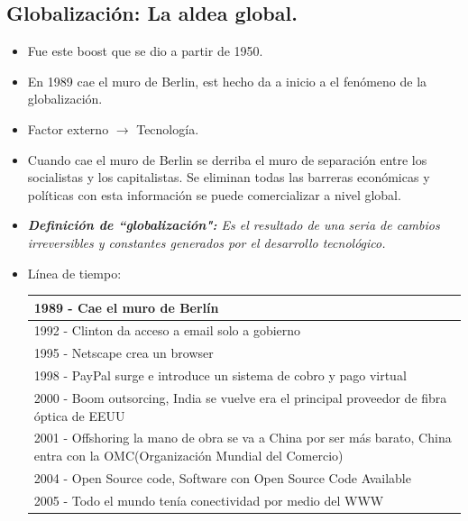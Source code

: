 \subsection{ Globalización: La aldea global.}
\begin{itemize}
    \item Fue este boost que se dio a partir de 1950.
    \item En 1989 cae el muro de Berlin, est hecho da a inicio a el fenómeno de la globalización.
    \item Factor externo $\rightarrow$ Tecnología.
    \item Cuando cae el muro de Berlin se derriba el muro de separación entre los socialistas y los capitalistas. Se eliminan todas las barreras económicas y políticas con esta información se puede comercializar a nivel global.
    \item \emph{\textbf{Definición de ``globalización":} Es el resultado de una seria de cambios irreversibles y constantes generados por el desarrollo tecnológico.}
    \item Línea de tiempo: 
        \begin{center}
            \begin{tabular}{ | p{15cm} | }
                \hline
                    1989 - Cae el muro de Berlín \\ 
                    \hline
                    1992 - Clinton da acceso a email solo a gobierno  \\ 
                    \hline
                    1995 - Netscape crea un browser \\ 
                    \hline
                    1998 - PayPal surge e introduce un sistema de cobro y pago virtual \\ 
                    \hline
                    2000 - Boom outsorcing, India se vuelve era el principal proveedor de fibra óptica de EEUU \\ 
                    \hline
                    2001 - Offshoring la mano de obra se va a China por ser más barato, China entra con la OMC(Organización Mundial del Comercio) \\ 
                    \hline
                    2004 - Open Source code, Software con Open Source Code Available  \\ 
                    \hline
                    2005 - Todo el mundo tenía conectividad por medio del WWW \\ 
                \hline
            \end{tabular}
        \end{center}
    

\end{itemize}
